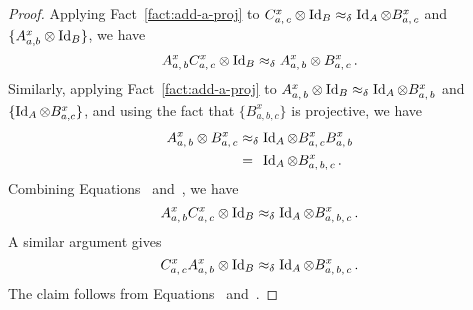 \begin{proof}
  Applying Fact~\ref{fact:add-a-proj} to $C^x_{a,\, c} \otimes \mathop{\rm Id}\nolimits_B
  \approx_\delta \mathop{\rm Id}\nolimits_A \otimes B^x_{a,\, c}$ and $\{A^x_{a,b} \otimes
  \mathop{\rm Id}\nolimits_B \}$, we have
  \begin{equation}
    \label{eq:commutation-analysis-1}
    A^x_{a,\, b} C^x_{a,\, c} \otimes \mathop{\rm Id}\nolimits_B
    \approx_\delta A^x_{a,\, b} \otimes B^x_{a,\, c}\,.
  \end{equation}
  Similarly, applying Fact~\ref{fact:add-a-proj} to $A^x_{a,\, b} \otimes
  \mathop{\rm Id}\nolimits_B \approx_\delta \mathop{\rm Id}\nolimits_A \otimes B^x_{a,\, b}$ and $\{\mathop{\rm Id}\nolimits_A
  \otimes B^x_{a,c}\}$, and using the fact that $\{B^x_{a,b,c}\}$ is projective,
  we have
  \begin{equation}
    \label{eq:commutation-analysis-2}
    \begin{split}
      A^x_{a,\, b} \otimes B^x_{a,\, c}
      & \approx_\delta \mathop{\rm Id}\nolimits_A \otimes B^x_{a,\, c} B^x_{a,\, b}\\
      & =_{\phantom{\delta}} \mathop{\rm Id}\nolimits_A \otimes B^x_{a,\, b,\, c}\,.
    \end{split}
  \end{equation}
  Combining Equations~
  and~, we have
  \begin{equation}
    \label{eq:commutation-analysis-3}
    A^x_{a,\, b} C^x_{a,\, c} \otimes \mathop{\rm Id}\nolimits_B \approx_\delta
    \mathop{\rm Id}\nolimits_A \otimes B^x_{a,\, b,\, c}\,.
  \end{equation}
  A similar argument gives
  \begin{equation}
    \label{eq:commutation-analysis-4}
    C^x_{a,\, c} A^x_{a,\, b} \otimes \mathop{\rm Id}\nolimits_B \approx_\delta
    \mathop{\rm Id}\nolimits_A \otimes B^x_{a,\, b,\, c}\,.
  \end{equation}
  The claim follows from Equations~
  and~.
\end{proof}

